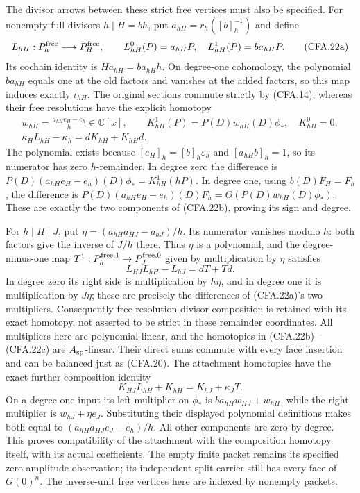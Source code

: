 The divisor arrows between these strict free vertices must also be
specified.  For nonempty full divisors $h\mid H=bh$, put
$a_{hH}=r_h([b]_h^{-1})$ and define
\[
 L_{hH}:P_h^{\rm free}\longrightarrow P_H^{\rm free},\qquad
 L_{hH}^0(P)=a_{hH}P,\quad L_{hH}^1(P)=b a_{hH}P.
                                                               \tag{CFA.22a}
\]
Its cochain identity is $H a_{hH}=b a_{hH}h$.
On degree-one cohomology, the polynomial $ba_{hH}$ equals one
at the old factors and vanishes at the added factors, so this map
induces exactly $\iota_{hH}$.  The original sections commute strictly
by (CFA.14), whereas their free resolutions have the explicit homotopy
\[
\begin{gathered}
 w_{hH}=\frac{a_{hH}e_H-e_h}{h}\in\mathbb C[x],\qquad
 K_{hH}^1(P)=P(D)w_{hH}(D)\phi_*,\quad K_{hH}^0=0,\\
 \kappa_H L_{hH}-\kappa_h=dK_{hH}+K_{hH}d.
\end{gathered}                                                 \tag{CFA.22b}
\]
The polynomial exists because
$[e_H]_h=[b]_h\varepsilon_h$ and $[a_{hH}b]_h=1$, so its
numerator has zero $h$-remainder.  In degree zero the difference
is $P(D)(a_{hH}e_H-e_h)(D)\phi_*=K_{hH}^1(hP)$.
In degree one, using $b(D)F_H=F_h$, the difference is
$P(D)(a_{hH}e_H-e_h)(D)F_h
=\Theta(P(D)w_{hH}(D)\phi_*)$.  These are exactly the two
components of (CFA.22b), proving its sign and degree.

For $h\mid H\mid J$, put
$\eta=(a_{hH}a_{HJ}-a_{hJ})/h$.
Its numerator vanishes modulo $h$: both factors give the inverse
of $J/h$ there.  Thus $\eta$ is a polynomial, and the degree-minus-one
map $T^1:P_h^{{\rm free},1}\to P_J^{{\rm free},0}$ given by
multiplication by $\eta$ satisfies
\[
 L_{HJ}L_{hH}-L_{hJ}=dT+Td.                                  \tag{CFA.22c}
\]
In degree zero its right side is multiplication by $h\eta$,
and in degree one it is multiplication by $J\eta$; these are
precisely the differences of (CFA.22a)'s two multipliers.
Consequently free-resolution divisor composition is retained with
its exact homotopy, not asserted to be strict in these remainder
coordinates.  All multipliers here are polynomial-linear, and the
homotopies in (CFA.22b)--(CFA.22c) are $A_{\rm sp}$-linear.
Their direct sums commute
with every face insertion and can be balanced just as (CFA.20).
The attachment homotopies have the exact further composition identity
\[
 K_{HJ}L_{hH}+K_{hH}=K_{hJ}+\kappa_JT.                        \tag{CFA.22d}
\]
On a degree-one input its left multiplier on $\phi_*$ is
$b a_{hH}w_{HJ}+w_{hH}$, while the right multiplier is
$w_{hJ}+\eta e_J$.  Substituting their displayed polynomial
definitions makes both equal to
$(a_{hH}a_{HJ}e_J-e_h)/h$.  All other components are zero by
degree.  This proves compatibility of the attachment with the
composition homotopy itself, with its actual coefficients.
The empty finite packet remains its specified zero amplitude
observation; its independent split carrier still has every face
of $G(0)^n$.  The inverse-unit free vertices here are indexed by
nonempty packets.

